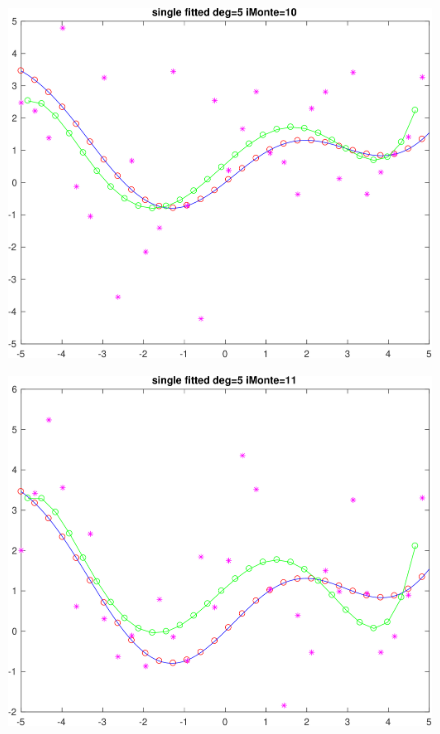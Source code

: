 \begin{figure}[h!]
\centering\includegraphics[scale=0.1]{single_poly_d_5_iMonte_10.png}
\end{figure}


\begin{figure}[h!]
\centering\includegraphics[scale=0.1]{single_poly_d_5_iMonte_11.png}
\end{figure}


